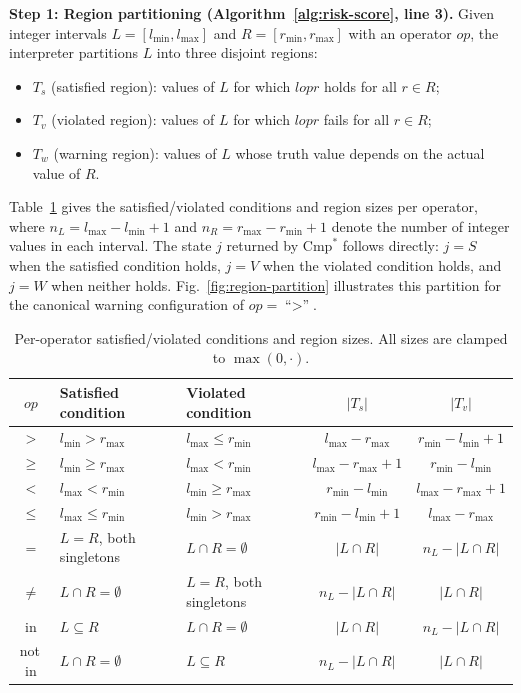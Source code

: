 \documentclass[pdflatex,sn-basic]{sn-jnl}%
\theoremstyle{thmstyleone}%
\theoremstyle{thmstyletwo}%
\theoremstyle{thmstylethree}%
\begin{document}
\smallskip
\noindent\textbf{Step 1: Region partitioning (Algorithm~\ref{alg:risk-score}, line 3).}
Given integer intervals $L = [l_{\min}, l_{\max}]$ and $R = [r_{\min}, r_{\max}]$ with an operator $op$, the interpreter partitions $L$ into three disjoint regions:
\begin{itemize}
    \item $T_s$ (satisfied region): values of $L$ for which $l \mathrel{op} r$ holds for all $r \in R$;
    \item $T_v$ (violated region): values of $L$ for which $l \mathrel{op} r$ fails for all $r \in R$;
    \item $T_w$ (warning region): values of $L$ whose truth value depends on the actual value of $R$.
\end{itemize}

Table~\ref{tab:op-formulas} gives the satisfied/violated conditions and region sizes per operator, where $n_L = l_{\max} - l_{\min} + 1$ and $n_R = r_{\max} - r_{\min} + 1$ denote the number of integer values in each interval.
The state $j$ returned by $\text{Cmp}^*$ follows directly: $j = S$ when the satisfied condition holds, $j = V$ when the violated condition holds, and $j = W$ when neither holds.
Fig.~\ref{fig:region-partition} illustrates this partition for the canonical warning configuration of $op = \text{``$>$''}$.

\begin{table}[t]
\centering
\caption{Per-operator satisfied/violated conditions and region sizes. All sizes are clamped to $\max(0, \cdot)$.}
\label{tab:op-formulas}
\small
\begin{tabular}{cllcc}
\toprule
$op$ & Satisfied condition & Violated condition & $|T_s|$ & $|T_v|$ \\
\midrule
$>$    & $l_{\min} > r_{\max}$    & $l_{\max} \leq r_{\min}$  & $l_{\max} - r_{\max}$     & $r_{\min} - l_{\min} + 1$ \\
$\geq$ & $l_{\min} \geq r_{\max}$ & $l_{\max} < r_{\min}$     & $l_{\max} - r_{\max} + 1$ & $r_{\min} - l_{\min}$     \\
$<$    & $l_{\max} < r_{\min}$    & $l_{\min} \geq r_{\max}$  & $r_{\min} - l_{\min}$     & $l_{\max} - r_{\max} + 1$ \\
$\leq$ & $l_{\max} \leq r_{\min}$ & $l_{\min} > r_{\max}$     & $r_{\min} - l_{\min} + 1$ & $l_{\max} - r_{\max}$     \\
\midrule
$=$    & $L = R$, both singletons  & $L \cap R = \emptyset$  & $|L \cap R|$ & $n_L - |L \cap R|$ \\
$\neq$ & $L \cap R = \emptyset$  & $L = R$, both singletons  & $n_L - |L \cap R|$ & $|L \cap R|$ \\
\midrule
in     & $L \subseteq R$ & $L \cap R = \emptyset$ & $|L \cap R|$       & $n_L - |L \cap R|$ \\
not\,in & $L \cap R = \emptyset$ & $L \subseteq R$ & $n_L - |L \cap R|$ & $|L \cap R|$       \\
\bottomrule
\end{tabular}
\end{table}
\end{document}
